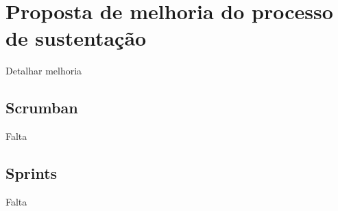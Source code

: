 \section{Proposta de melhoria do processo de sustentação}\label{sec:proposta}

Detalhar melhoria



\subsection{Scrumban}

Falta

\subsection{Sprints}

Falta